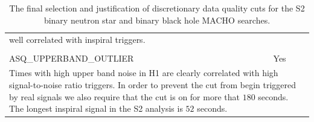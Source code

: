 \begin{table}[p]
\begin{center}
\begin{tabular}{ll}
{{well correlated with inspiral triggers.\baselineskip=14pt}} \\
\\
ASQ\_UPPERBAND\_OUTLIER   & Yes \\
\multicolumn{2}{l}{\parbox{\linewidth}{\footnotesize Times with high upper band
noise in H1 are clearly correlated with high signal-to-noise ratio triggers.
In order to prevent the cut from begin triggered by real signals we also
require that the cut is on for more that $180$ seconds. The longest inspiral
signal in the S2 analysis is $52$ seconds.\baselineskip=14pt}}\\
\end{tabular}
\end{center}
\caption[Choice of Data Quality Cuts in S2]{%
The final selection and justification of discretionary data quality cuts for
the S2 binary neutron star and binary black hole MACHO searches.}
\end{table}

